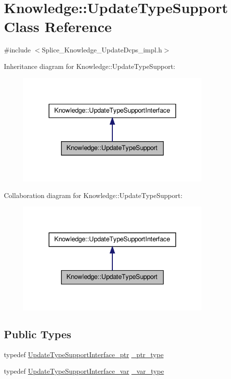 \hypertarget{classKnowledge_1_1UpdateTypeSupport}{
\section{Knowledge::UpdateTypeSupport Class Reference}
\label{de/d96/classKnowledge_1_1UpdateTypeSupport}
}


{\ttfamily \#include $<$Splice\_\-Knowledge\_\-UpdateDcps\_\-impl.h$>$}



Inheritance diagram for Knowledge::UpdateTypeSupport:
\nopagebreak
\begin{figure}[H]
\begin{center}
\leavevmode
\includegraphics[width=276pt]{dd/d18/classKnowledge_1_1UpdateTypeSupport__inherit__graph}
\end{center}
\end{figure}


Collaboration diagram for Knowledge::UpdateTypeSupport:
\nopagebreak
\begin{figure}[H]
\begin{center}
\leavevmode
\includegraphics[width=276pt]{de/d84/classKnowledge_1_1UpdateTypeSupport__coll__graph}
\end{center}
\end{figure}
\subsection*{Public Types}
\begin{DoxyCompactItemize}
\item 
typedef \hyperlink{classKnowledge_1_1UpdateTypeSupportInterface}{UpdateTypeSupportInterface\_\-ptr} \hyperlink{classKnowledge_1_1UpdateTypeSupportInterface_a35b969e998255d5c4a68cf2887debd92}{\_\-ptr\_\-type}
\item 
typedef \hyperlink{namespaceKnowledge_a933872871f686a514362b32892d09283}{UpdateTypeSupportInterface\_\-var} \hyperlink{classKnowledge_1_1UpdateTypeSupportInterface_afb29ad9f293bdad6236737eeb811774a}{\_\-var\_\-type}
\end{DoxyCompactItemize}
